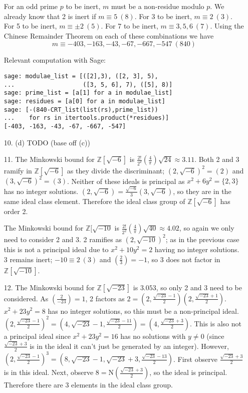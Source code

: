 \documentclass{article}
\newcommand{\Z}[0]{\mathbb{Z}}
\newcommand{\norm}[0]{\text{N}}
\newcommand{\modequiv}[3]{#1 \equiv #2\ (#3)}
\newcommand{\legendre}[2]{\genfrac{(}{)}{}{}{#1}{#2}}
\begin{document}
\begin{enumerate}
    For an odd prime $p$ to be inert, $m$ must be a non-residue modulo $p$.  We already know that 2 is inert if $\modequiv{m}{5}{8}$.  For 3 to be inert, $\modequiv{m}{2}{3}$.  For 5 to be inert, $\modequiv{m}{\pm 2}{5}$.  For 7 to be inert, $\modequiv{m}{3, 5, 6}{7}$.  Using the Chinese Remainder Theorem on each of these combinations we have \[ \modequiv{m}{-403, -163, -43, -67, -667, -547}{840} \]

    Relevant computation with Sage:
\begin{verbatim}
sage: modulae_list = [([2],3), ([2, 3], 5),
...                   ([3, 5, 6], 7), ([5], 8)]
sage: prime_list = [a[1] for a in modulae_list]
sage: residues = [a[0] for a in modulae_list]
sage: [-(840-CRT_list(list(rs),prime_list))
...    for rs in itertools.product(*residues)]
[-403, -163, -43, -67, -667, -547]
\end{verbatim}
\item[10. (d)] TODO (base off (c))
\item[11.]
    The Minkowski bound for $\Z[\sqrt{-6}]$ is $\frac{2!}{2^2}\left(\frac{4}{\pi}\right)\sqrt{24} \approx 3.11$.  Both 2 and 3 ramify in $\Z[\sqrt{-6}]$ as they divide the discriminant; $(2, \sqrt{-6})^2 = (2)$ and $(3, \sqrt{-6})^2 = (3)$.  Neither of these ideals is principal as $x^2 + 6y^2 = \{2, 3\}$ has no integer solutions. $(2, \sqrt{-6}) = \frac{\sqrt{-6}}{3}(3, \sqrt{-6})$, so they are in the same ideal class element.  Therefore the ideal class group of $\Z[\sqrt{-6}]$ has order 2.

    The Minkowski bound for $\Z[\sqrt{-10}$ is $\frac{2!}{2^2}\left(\frac{4}{\pi}\right)\sqrt{40} \approx 4.02$, so again we only need to consider 2 and 3.  2 ramifies as $(2, \sqrt{-10})^2$; as in the previous case this is not a principal ideal due to $x^2 + 10y^2 = 2$ having no integer solutions.  3 remains inert; $\modequiv{-10}{2}{3}$ and $\legendre{2}{3} = -1$, so 3 does not factor in $\Z[\sqrt{-10}]$.

\item[12.]
    The Minkowski bound for $\Z[\sqrt{-23}]$ is $3.053$, so only 2 and 3 need to be considered.  As $\legendre{2}{-23} = 1$, 2 factors as $2 = \left(2, \frac{\sqrt{-23} - 1}{2}\right)\left(2, \frac{\sqrt{-23} + 1}{2}\right)$.  $x^2 + 23y^2 = 8$ has no integer solutions, so this must be a non-principal ideal.  $\left(2, \frac{\sqrt{-23} - 1}{2}\right)^2 = (4, \sqrt{-23} - 1, \frac{\sqrt{-23} - 11}{2}) = (4, \frac{\sqrt{-23} + 3}{2})$.  This is also not a principal ideal since $x^2 + 23y^2 = 16$ has no solutions with $y \neq 0$ (since $\frac{\sqrt{-23} + 3}{2}$ is in the ideal it can't just be generated by an integer).  However, $\left(2, \frac{\sqrt{-23} - 1}{2}\right)^3 = (8, \sqrt{-23} - 1, \sqrt{-23} + 3, \frac{\sqrt{-23} - 13}{2})$.  First observe $\frac{\sqrt{-23} + 3}{2}$ is in this ideal.  Next, observe $8 = \norm(\frac{\sqrt{-23} + 3}{2})$, so the ideal is principal.  Therefore there are 3 elements in the ideal class group.


\end{enumerate}
\end{document}
